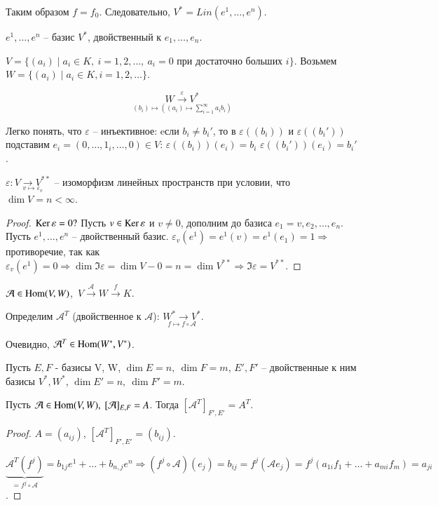 \documentclass[main]{subfiles}
\begin{document}
Таким образом $f = f_0$. Следовательно, $V^* = Lin(e^1,\dots,e^n)$.

$e^1, \ldots,e^n$ -- базис $V^*$, двойственный к $e_1,\dots, e_n$.
\begin{example}
    $V = \{(a_i) \mid a_i \in K, \ i = 1,2,\dots, \ a_i = 0 \text{ при достаточно больших } i \}$.
    Возьмем $W=\{(a_i) \mid a_i \in K, i = 1,2,\dots \}$.

    \[\underset{(b_i)\mapsto((a_i)\mapsto \sum_{i = 1}^{\infty}a_ib_i)}{W \overset{\varepsilon}{\longrightarrow} V^*}\]

    Легко понять, что $\varepsilon$ -- инъективное: eсли $b_i \neq b_i'$, то в $\varepsilon((b_i))$ и $\varepsilon((b_i'))$ подставим $e_i = (0, \ldots, 1_i, \ldots, 0) \in V$: $\varepsilon((b_i))(e_i) = b_i$ \neq $\varepsilon((b_i'))(e_i) = b_i'$.
\end{example}

\begin{proposition}
    $\varepsilon: \underset{v \mapsto \varepsilon_v}{V \to V^{**}}$ -- изоморфизм линейных пространств при условии,  что $\dim V=n < \infty$.
\end{proposition}

\begin{proof}
    $\operatorname{Ker}\varepsilon = 0 ?$
    Пусть $v \in \operatorname{Ker}\varepsilon$ и $v \neq 0$, дополним до базиса $e_1=v, e_2,\dots,e_n$.
    Пусть $e^1,\dots, e^n$ -- двойственный базис.
    $\varepsilon_v(e^1)=e^1(v) = e^1(e_1) = 1 \Rightarrow$ противоречие, так как $\varepsilon_v(e^1) = 0
        \Rightarrow \dim \Im \varepsilon = \dim V - 0 = n = \dim V^{**} \Rightarrow \Im \varepsilon = V^{**}$.
\end{proof}

$\mathcal{A} \in \operatorname{Hom}(V,W)$,\ $V \overset{\mathcal{A}}{\to} W \overset{f}{\to} K$.

Определим $\mathcal{A}^T$ (двойственное к $\mathcal{A}$): $\underset{f \mapsto f \circ \mathcal{A}}{W^* \to V^*}$.

Очевидно, $\mathcal{A}^T \in \operatorname{Hom}(W^*,V^*)$.

\begin{proposition}
    Пусть $E,F$ - базисы V, W, $\dim E = n, \ \dim F = m$, $E', F'$ -- двойственные к ним базисы $V^*, W^*$, $\dim E' = n, \ \dim F' = m$.

    Пусть $\mca \in \Hom(V,W), \ [\mathcal{A}]_{E,F} = A$. Тогда $[\mathcal{A}^T]_{F',E'} = A^T$.
\end{proposition}

\begin{proof}
    $A = (a_{ij})$, $[\mathcal{A}^T]_{F',E'} = (b_{ij})$.

    $\underbrace{\mathcal{A}^T(f^j)}_{=f^j\circ \mathcal{A}} = b_{1j}e^1+\dots+b_{n,j}e^n \Rightarrow  (f^j \circ \mathcal{A})(e_j) = b_{ij} = f^j(\mathcal{A}e_j)=f^j(a_{1i}f_1+\dots+a_{mi}f_m)=a_{ji}$.
\end{proof}
\end{document}
